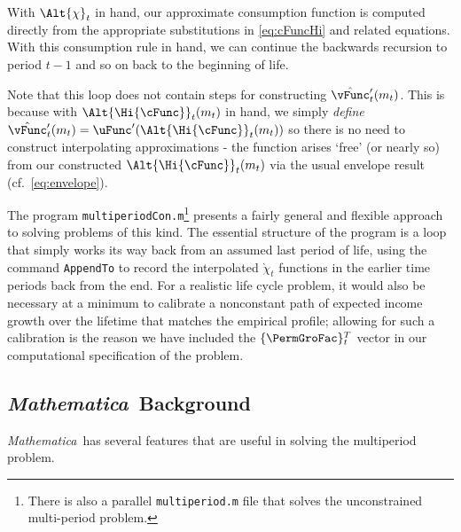 \documentclass[titlepage, headings=optiontotocandhead]{\econtex}
\newcommand{\Mma}{\textit{Mathematica}}
\begin{document}
With $\Alt{\chi}_{t}$ in hand, our approximate consumption function
is computed directly from the appropriate substitutions in \eqref{eq:cFuncHi}
and related equations.  With this consumption
rule in hand, we can continue the backwards recursion to period $t-1$
and so on back to the beginning of life.

Note that this loop does not contain steps for constructing
$\hat{\vFunc}_{t}^{\prime}({m}_{t})$. This is because with
$\Alt{\Hi{\cFunc}}_{t}({m}_{t})$ in
hand, we simply \textit{define} $\hat{\vFunc}^{\prime}_{t}({m}_{t}) = \uFunc^{\prime}(\Alt{\Hi{\cFunc}}_{t}({m}_{t}))$
so there is no need to construct interpolating approximations 
- the function arises `free' (or nearly so) from our constructed
$\Alt{\Hi{\cFunc}}_{t}({m}_{t})$ via the usual envelope result (cf.\ \eqref{eq:envelope}).

The program \texttt{multiperiodCon.m}\footnote{There is also a parallel \texttt{multiperiod.m} file that solves the unconstrained multi-period problem.} presents a fairly general and
flexible approach to solving problems of this kind. The essential
structure of the program is a loop that simply works its way back
from an assumed last period of life, using the command
\texttt{AppendTo} to record the interpolated $\grave{\chi}_{t}$ functions
in the earlier time periods back from the end. For a
realistic life cycle problem, it would also be necessary at a
minimum to calibrate a nonconstant path of expected income growth over the
lifetime that matches the empirical profile; allowing for such
a calibration is the reason we have included the $\{\PermGroFac\}_{t}^{T}$
vector in our computational specification of the problem.

\hypertarget{Mathmatica-Background}{}
\subsection{{\Mma}~Background}
{\Mma}~has several features that are useful in solving the
multiperiod problem.
\end{document}
